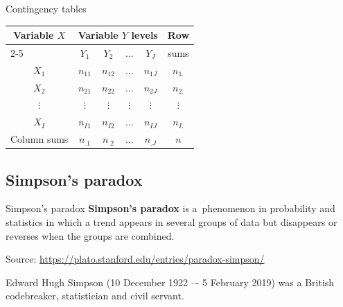 \documentclass[10pt,ignorenonframetext,aspectratio=169]{beamer}
\begin{document}
\begin{frame}{Contingency tables}

\begin{table}
	\begin{center}
			\begin{tabular}{|l|l|l|l|l|l|}
\hline
\multicolumn{1}{|c|}{Variable $X$} & \multicolumn{4}{c|}{Variable $Y$ levels} & \multicolumn{1}{c|}{Row} \\ 
\cline{2-5}
\multicolumn{1}{|c|}{Levels} & \multicolumn{1}{c|}{$Y_{1}$} & \multicolumn{1}{c|}{$Y_{2}$} & \multicolumn{1}{c|}{$\ldots$} & \multicolumn{1}{c|}{$Y_{J}$} & \multicolumn{1}{c|}{sums} \\ 
\hline
\multicolumn{1}{|c|}{$X_{1}$} & \multicolumn{1}{c|}{$n_{11}$} & \multicolumn{1}{c|}{$n_{12}$} & \multicolumn{1}{c|}{$\ldots$} & \multicolumn{1}{c|}{$n_{1J}$} & \multicolumn{1}{c|}{$n_{1.}$} \\ 
\hline
\multicolumn{1}{|c|}{$X_{2}$} & \multicolumn{1}{c|}{$n_{21}$} & \multicolumn{1}{c|}{$n_{22}$} & \multicolumn{1}{c|}{$\ldots$} & \multicolumn{1}{c|}{$n_{2J}$} & \multicolumn{1}{c|}{$n_{2.}$} \\ 
\hline
\multicolumn{1}{|c|}{$\vdots$} & \multicolumn{1}{c|}{$\vdots$} & \multicolumn{1}{c|}{$\vdots$} & \multicolumn{1}{c|}{$\vdots$} & \multicolumn{1}{c|}{$\vdots$} & \multicolumn{1}{c|}{$\vdots$} \\ 
\hline
\multicolumn{1}{|c|}{$X_{I}$} & \multicolumn{1}{c|}{$n_{I1}$} & \multicolumn{1}{c|}{$n_{I2}$} & \multicolumn{1}{c|}{$\ldots$} & \multicolumn{1}{c|}{$n_{IJ}$} & \multicolumn{1}{c|}{$n_{I.}$} \\ 
\hline
\multicolumn{1}{|c|}{Column sums} & \multicolumn{1}{c|}{$n_{.1}$} & \multicolumn{1}{c|}{$n_{.2}$} & \multicolumn{1}{c|}{$\ldots$} & \multicolumn{1}{c|}{$n_{.J}$} & \multicolumn{1}{c|}{$n$} \\ 
\hline
\end{tabular}
	\label{tab1}
	\end{center}
\end{table}

\end{frame}


\subsection{Simpson's paradox}

\begin{frame}{Simpson's paradox}
    \textbf{Simpson's paradox} is a~phenomenon in probability and statistics in which a trend appears in several groups of data but disappears or reverses when the groups are combined. 

    \vspace{1cm}

    Source: \url{https://plato.stanford.edu/entries/paradox-simpson/}

    \vspace{1cm}

    Edward Hugh Simpson (10 December 1922 –- 5 February 2019) was a British codebreaker, statistician and civil servant. 
    
\end{frame}
\end{document}
